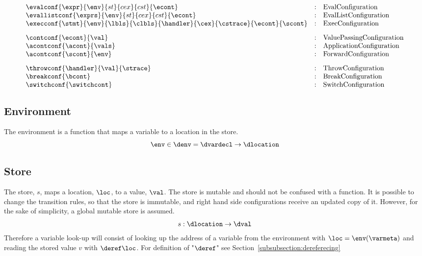 \documentclass{article}
\begin{document}
\[
  \begin{array}{lcl}
	\evalconf{\expr}{\env}{st}{cex}{cst}{\econt} & : &
	\textrm{EvalConfiguration}\\

	\evallistconf{\exprs}{\env}{st}{cex}{cst}{\econt} & : &
	\textrm{EvalListConfiguration}\\

	\execconf{\stmt}{\env}{\lbls}{\clbls}{\handler}{\cex}{\cstrace}{\econt}{\scont}  & : &
	\textrm{ExecConfiguration}\\[3mm]

	\contconf{\econt}{\val} & : &
	\textrm{ValuePassingConfiguration}\\

	\acontconf{\acont}{\vals} & : &
	\textrm{ApplicationConfiguration}\\

	\acontconf{\scont}{\env} & : &
	\textrm{ForwardConfiguration}\\[3mm]

	\throwconf{\handler}{\val}{\strace} & : &
	\textrm{ThrowConfiguration}\\

	\breakconf{\bcont} & : &
	\textrm{BreakConfiguration}\\

	\switchconf{\switchcont} & : &
	\textrm{SwitchConfiguration}\\

  \end{array}
\]
\subsection{Environment}
\label{subsec:env-definition}
The environment is a function that maps a variable to a location in the store.
\[\env \in \denv = \dvardecl \rightarrow \dlocation\] 
\subsection{Store}
\label{subsec:store-definition}
The store, $s$, maps a location, $\loc$, to a value, $\val$. The store is mutable and should not be confused with a function. It is possible to change the transition rules, so that the store is immutable, and right hand side configurations receive an updated copy of it. However, for the sake of simplicity, a global mutable store is assumed. 
\[s : \dlocation \rightarrow \dval \]
Therefore a variable look-up will consist of looking up the address of a variable from the environment with $\loc = \env(\varmeta)$ and reading the stored value $v$ with $\deref\loc$. For definition of "$\deref$" see Section~\ref{subsubsection:dereferecing} 
\end{document}
